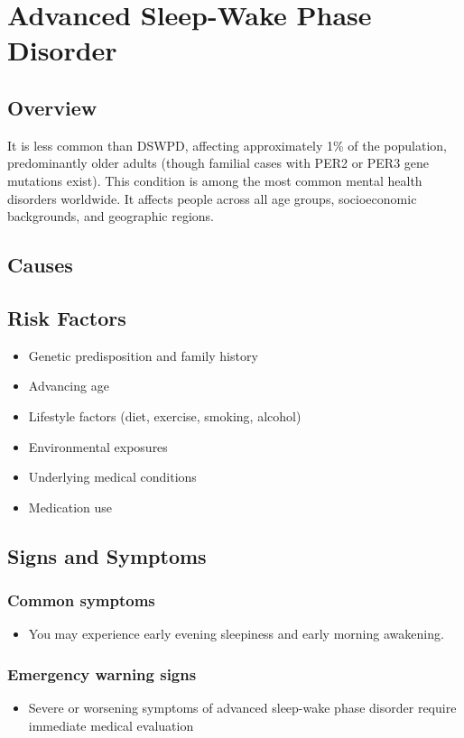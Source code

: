 \chapter{Advanced Sleep-Wake Phase Disorder}
\label{sec:Advanced Sleep-Wake Phase Disorder}

\section{Overview}
It is less common than DSWPD, affecting approximately 1\% of the population, predominantly older adults (though familial cases with PER2 or PER3 gene mutations exist). This condition is among the most common mental health disorders worldwide. It affects people across all age groups, socioeconomic backgrounds, and geographic regions.
\section{Causes}
\section{Risk Factors}

\begin{itemize}[noitemsep]
  \item Genetic predisposition and family history
  \item Advancing age
  \item Lifestyle factors (diet, exercise, smoking, alcohol)
  \item Environmental exposures
  \item Underlying medical conditions
  \item Medication use
\end{itemize}
\section{Signs and Symptoms}

\subsection{Common symptoms}
\begin{itemize}[noitemsep]
  \item You may experience early evening sleepiness and early morning awakening. 
  \end{itemize}

\subsection{Emergency warning signs}
\begin{itemize}[noitemsep]
  \item Severe or worsening symptoms of advanced sleep-wake phase disorder require immediate medical evaluation
\end{itemize}
